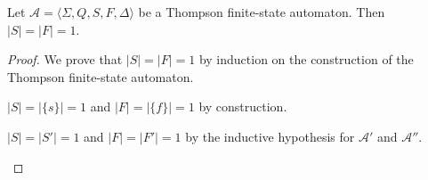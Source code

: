 \begin{proposition}
	Let $\mathcal{A} = \langle \Sigma, Q, S, F, \Delta \rangle$ be a Thompson
	finite-state automaton. Then $|S| = |F| = 1$.
\end{proposition}

\begin{proof}
	We prove that $|S| = |F| = 1$ by induction on the construction of the
	Thompson finite-state automaton.

	\begin{case}
		$|S| = |\{ s \}| = 1$ and $|F| = |\{ f \}| = 1$ by construction.
	\end{case}

	\begin{case}
		$|S| = |S'| = 1$ and $|F| = |F'| = 1$ by the inductive hypothesis
		for $\mathcal{A'}$ and $\mathcal{A''}$.
	\end{case}
\end{proof}
